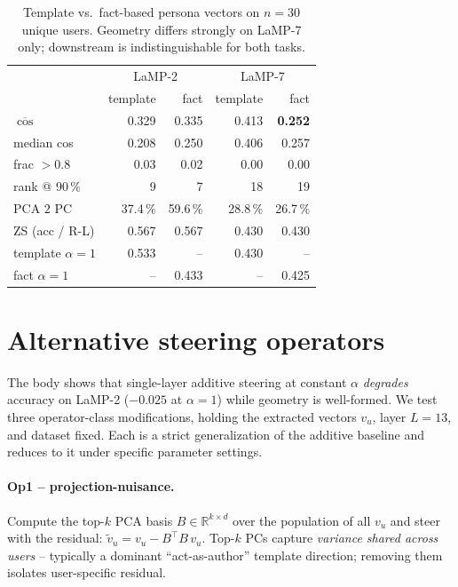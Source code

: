 \documentclass{article}
\begin{document}
\begin{table}[h]
\centering\small
\begin{tabular}{lrrrr}
\toprule
                  & \multicolumn{2}{c}{LaMP-2}  & \multicolumn{2}{c}{LaMP-7} \\
                  & template & fact            & template & fact \\
\midrule
$\overline{\cos}$         & 0.329 & 0.335       & 0.413 & \textbf{0.252} \\
median cos                & 0.208 & 0.250       & 0.406 & 0.257          \\
frac $>0.8$               & 0.03  & 0.02        & 0.00  & 0.00           \\
rank @ 90\,\%             & 9     & 7           & 18    & 19             \\
PCA $2$ PC                & 37.4\,\% & 59.6\,\% & 28.8\,\% & 26.7\,\%   \\
\midrule
ZS (acc / R-L)            & 0.567 & 0.567       & 0.430 & 0.430          \\
template $\alpha{=}1$     & 0.533 & --          & 0.430 & --             \\
fact $\alpha{=}1$         &  --   & 0.433       &  --   & 0.425          \\
\bottomrule
\end{tabular}
\caption{Template vs.\ fact-based persona vectors on $n{=}30$ unique
users. Geometry differs strongly on LaMP-7 only; downstream is
indistinguishable for both tasks.}
\label{tab:positive_control}
\end{table}

\section{Alternative steering operators}
\label{app:operators}
The body shows that single-layer additive steering at constant $\alpha$
\emph{degrades} accuracy on LaMP-2 ($-0.025$ at $\alpha{=}1$) while
geometry is well-formed.  We test three operator-class modifications,
holding the extracted vectors $v_u$, layer $L{=}13$, and dataset
fixed.  Each is a strict generalization of the additive baseline and
reduces to it under specific parameter settings.

\paragraph{Op1 -- projection-nuisance.}  Compute the top-$k$ PCA basis
$B\!\in\!\mathbb{R}^{k\times d}$ over the population of all $v_u$ and
steer with the residual:
$\tilde v_u = v_u - B^{\!\top}\! B\, v_u$.  Top-$k$ PCs capture
\emph{variance shared across users} -- typically a dominant
``act-as-author'' template direction; removing them isolates
user-specific residual.
\end{document}
